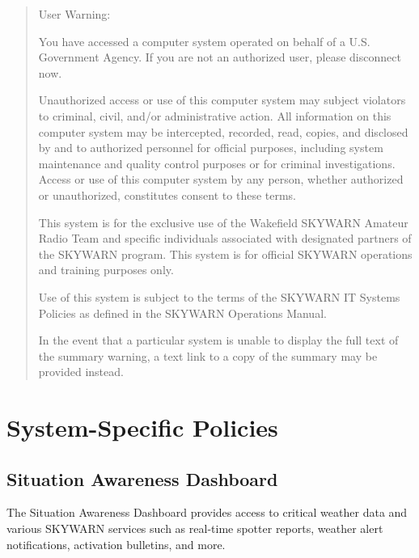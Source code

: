 \documentclass[pdflatex,letterpaper,twoside,12pt]{book}
\begin{document}
\begin{quote}
User Warning:

You have accessed a computer system operated on behalf of a U.S. Government Agency. If you are not an authorized user, please disconnect now.

Unauthorized access or use of this computer system may subject violators to criminal, civil, and/or administrative action.  All information on this computer system may be intercepted, recorded, read, copies, and disclosed by and to authorized personnel for official purposes, including system maintenance and quality control purposes or for criminal investigations.  Access or use of this computer system by any person, whether authorized or unauthorized, constitutes consent to these terms.

This system is for the exclusive use of the Wakefield SKYWARN Amateur Radio Team and specific individuals associated with designated partners of the SKYWARN program.  This system is for official SKYWARN operations and training purposes only.

Use of this system is subject to the terms of the SKYWARN IT Systems Policies as defined in the SKYWARN Operations Manual.

In the event that a particular system is unable to display the full text of the summary warning, a text link to a copy of the summary may be provided instead.
\end{quote}


\chapter{System-Specific Policies}


\section{Situation Awareness Dashboard}

The Situation Awareness Dashboard provides access to critical weather data and various SKYWARN services such as real-time spotter reports, weather alert notifications, activation bulletins, and more.
\end{document}
